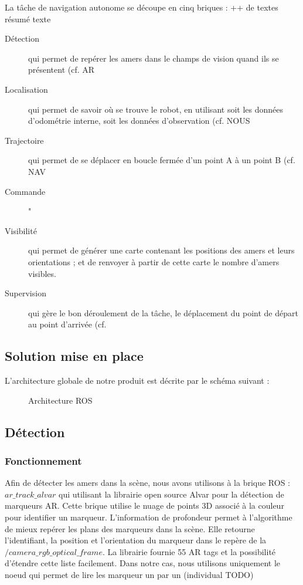 \documentclass[10pt,a4paper]{article}
\begin{document}
La tâche de navigation autonome se découpe en cinq briques : ++ de textes résumé texte 
\begin{description}
\item [Détection] qui permet de repérer les amers dans le champs de vision quand ils se présentent (cf. AR
\item [Localisation] qui permet de savoir où se trouve le robot, en utilisant soit les données d'odométrie interne, soit les données d’observation (cf. NOUS
\item [Trajectoire] qui permet de se déplacer en boucle fermée d'un point A à un point B (cf. NAV
\item [Commande] "
\item [Visibilité] qui permet de générer une carte contenant les positions des amers et leurs orientations ; et de renvoyer à partir de cette carte le nombre d'amers visibles.
\item [Supervision] qui gère le bon déroulement de la tâche, le déplacement du point de départ au point d'arrivée (cf. 
\end{description}



\subsection{Solution mise en place}
\label{sec:solution_mise_en_place}

L'architecture globale de notre produit est décrite par le schéma suivant :

\begin{figure}[h]
\center
\caption{Architecture ROS}	
\end{figure}




\subsection{Détection}
\label{sec:detection}

\subsubsection*{Fonctionnement}
Afin de détecter les amers dans la scène, nous avons utilisons à la brique ROS : $ar\_track\_alvar$ qui utilisant la librairie open source Alvar pour la détection de marqueurs AR.
Cette brique utilise le nuage de points 3D associé à la couleur pour identifier un marqueur. L'information de profondeur permet à l'algorithme de mieux repérer les plans des marqueurs dans la scène. Elle retourne l'identifiant, la position et l'orientation du marqueur dans le repère de la $/camera\_rgb\_optical\_frame$. La librairie fournie 55 AR tags et la possibilité d'étendre cette liste facilement. Dans notre cas, nous utilisons uniquement le noeud qui permet de lire les marqueur un par un (individual TODO)
\end{document}
